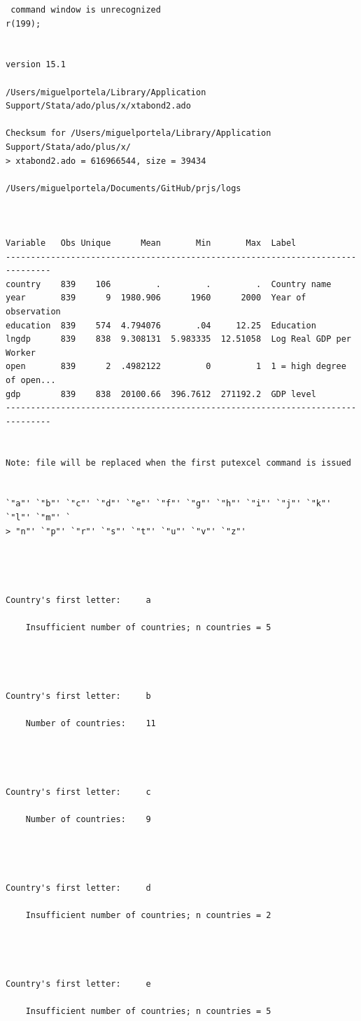 \documentclass[
  12pt,
]{article}
\begin{document}
\begin{verbatim}
 command window is unrecognized
r(199);


version 15.1

/Users/miguelportela/Library/Application Support/Stata/ado/plus/x/xtabond2.ado

Checksum for /Users/miguelportela/Library/Application Support/Stata/ado/plus/x/
> xtabond2.ado = 616966544, size = 39434

/Users/miguelportela/Documents/GitHub/prjs/logs



Variable   Obs Unique      Mean       Min       Max  Label
-------------------------------------------------------------------------------
country    839    106         .         .         .  Country name
year       839      9  1980.906      1960      2000  Year of observation
education  839    574  4.794076       .04     12.25  Education
lngdp      839    838  9.308131  5.983335  12.51058  Log Real GDP per Worker
open       839      2  .4982122         0         1  1 = high degree of open...
gdp        839    838  20100.66  396.7612  271192.2  GDP level
-------------------------------------------------------------------------------


Note: file will be replaced when the first putexcel command is issued


`"a"' `"b"' `"c"' `"d"' `"e"' `"f"' `"g"' `"h"' `"i"' `"j"' `"k"' `"l"' `"m"' `
> "n"' `"p"' `"r"' `"s"' `"t"' `"u"' `"v"' `"z"'




Country's first letter:     a

    Insufficient number of countries; n countries = 5




Country's first letter:     b

    Number of countries:    11




Country's first letter:     c

    Number of countries:    9




Country's first letter:     d

    Insufficient number of countries; n countries = 2




Country's first letter:     e

    Insufficient number of countries; n countries = 5





\end{verbatim}
\end{document}
